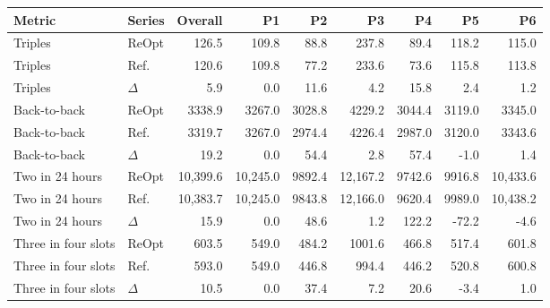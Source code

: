 \begin{tabular}{llrrrrrrr}
\toprule
\textbf{Metric} & \textbf{Series} & \textbf{Overall} & \textbf{P1} & \textbf{P2} & \textbf{P3} & \textbf{P4} & \textbf{P5} & \textbf{P6} \\
\midrule
Triples & ReOpt & 126.5 & 109.8 & 88.8 & 237.8 & 89.4 & 118.2 & 115.0 \\
Triples & Ref. & 120.6 & 109.8 & 77.2 & 233.6 & 73.6 & 115.8 & 113.8 \\
Triples & $\Delta$ & 5.9 & 0.0 & 11.6 & 4.2 & 15.8 & 2.4 & 1.2 \\
\addlinespace
Back-to-back & ReOpt & 3338.9 & 3267.0 & 3028.8 & 4229.2 & 3044.4 & 3119.0 & 3345.0 \\
Back-to-back & Ref. & 3319.7 & 3267.0 & 2974.4 & 4226.4 & 2987.0 & 3120.0 & 3343.6 \\
Back-to-back & $\Delta$ & 19.2 & 0.0 & 54.4 & 2.8 & 57.4 & -1.0 & 1.4 \\
\addlinespace
Two in 24 hours & ReOpt & 10{,}399.6 & 10{,}245.0 & 9892.4 & 12{,}167.2 & 9742.6 & 9916.8 & 10{,}433.6 \\
Two in 24 hours & Ref. & 10{,}383.7 & 10{,}245.0 & 9843.8 & 12{,}166.0 & 9620.4 & 9989.0 & 10{,}438.2 \\
Two in 24 hours & $\Delta$ & 15.9 & 0.0 & 48.6 & 1.2 & 122.2 & -72.2 & -4.6 \\
\addlinespace
Three in four slots & ReOpt & 603.5 & 549.0 & 484.2 & 1001.6 & 466.8 & 517.4 & 601.8 \\
Three in four slots & Ref. & 593.0 & 549.0 & 446.8 & 994.4 & 446.2 & 520.8 & 600.8 \\
Three in four slots & $\Delta$ & 10.5 & 0.0 & 37.4 & 7.2 & 20.6 & -3.4 & 1.0 \\
\bottomrule
\end{tabular}
